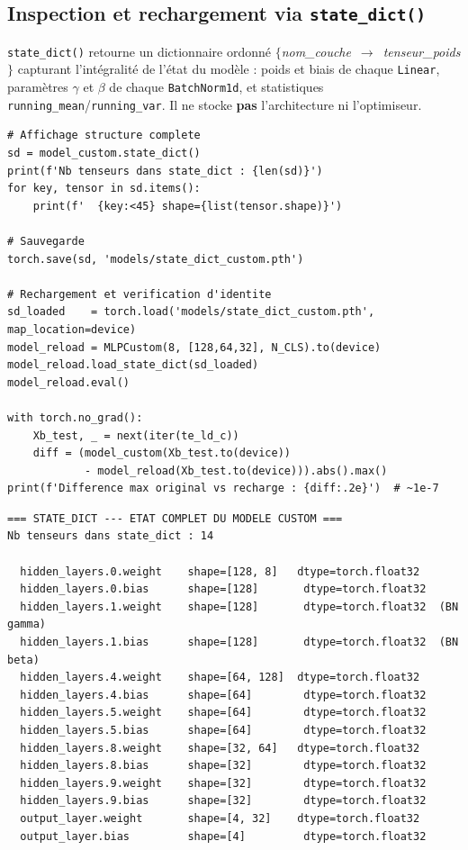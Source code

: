 \documentclass[12pt,a4paper]{report}
\begin{document}
\subsection{Inspection et rechargement via \texttt{state\_dict()}}

\begin{newbox}

\texttt{state\_dict()} retourne un dictionnaire ordonné
$\{$\textit{nom\_couche}~$\to$~\textit{tenseur\_poids}$\}$ capturant l'intégralité 
de l'état du modèle : poids et biais de chaque \texttt{Linear}, paramètres 
$\gamma$ et $\beta$ de chaque \texttt{BatchNorm1d}, et statistiques 
\texttt{running\_mean}/\texttt{running\_var}. Il ne stocke \textbf{pas} 
l'architecture ni l'optimiseur.

\begin{lstlisting}[caption=Inspection de state\_dict() et vérification du rechargement]
# Affichage structure complete
sd = model_custom.state_dict()
print(f'Nb tenseurs dans state_dict : {len(sd)}')
for key, tensor in sd.items():
    print(f'  {key:<45} shape={list(tensor.shape)}')

# Sauvegarde
torch.save(sd, 'models/state_dict_custom.pth')

# Rechargement et verification d'identite
sd_loaded    = torch.load('models/state_dict_custom.pth', map_location=device)
model_reload = MLPCustom(8, [128,64,32], N_CLS).to(device)
model_reload.load_state_dict(sd_loaded)
model_reload.eval()

with torch.no_grad():
    Xb_test, _ = next(iter(te_ld_c))
    diff = (model_custom(Xb_test.to(device))
            - model_reload(Xb_test.to(device))).abs().max()
print(f'Difference max original vs recharge : {diff:.2e}')  # ~1e-7
\end{lstlisting}

\begin{outputbox}
\begin{verbatim}
=== STATE_DICT --- ETAT COMPLET DU MODELE CUSTOM ===
Nb tenseurs dans state_dict : 14

  hidden_layers.0.weight    shape=[128, 8]   dtype=torch.float32
  hidden_layers.0.bias      shape=[128]       dtype=torch.float32
  hidden_layers.1.weight    shape=[128]       dtype=torch.float32  (BN gamma)
  hidden_layers.1.bias      shape=[128]       dtype=torch.float32  (BN beta)
  hidden_layers.4.weight    shape=[64, 128]  dtype=torch.float32
  hidden_layers.4.bias      shape=[64]        dtype=torch.float32
  hidden_layers.5.weight    shape=[64]        dtype=torch.float32
  hidden_layers.5.bias      shape=[64]        dtype=torch.float32
  hidden_layers.8.weight    shape=[32, 64]   dtype=torch.float32
  hidden_layers.8.bias      shape=[32]        dtype=torch.float32
  hidden_layers.9.weight    shape=[32]        dtype=torch.float32
  hidden_layers.9.bias      shape=[32]        dtype=torch.float32
  output_layer.weight       shape=[4, 32]    dtype=torch.float32
  output_layer.bias         shape=[4]         dtype=torch.float32


\end{verbatim}
\end{outputbox}
\end{newbox}
\end{document}
